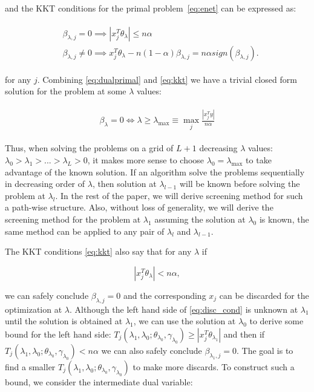 and the KKT conditions for the primal problem~\eqref{eq:enet} can be expressed as:

\begin{gather}
    \label{eq:kkt}
    \begin{aligned}&\beta_{\lambda,j}=0\implies|x_j^T\theta_\lambda|\leq n\alpha\\
    & \beta_{\lambda,j}\neq0\implies  x_j^T\theta_\lambda-n(1-\alpha)\beta_{\lambda,j}=n\alpha\textit{sign}(\beta_{\lambda,j}).
    \end{aligned}
\end{gather}

for any $j$. Combining \eqref{eq:dualprimal} and \eqref{eq:kkt} we have a trivial closed form solution for the problem at some $\lambda$ values:

\begin{gather}
    \label{eq:lammax}
    \begin{aligned}
        \beta_\lambda=0\iff \lambda \geq \lambda_{\max}\equiv \max_j \frac{|x_j^Ty|}{n\alpha}
    \end{aligned}
\end{gather}

Thus, when solving the problems on a grid of $L+1$ decreasing $\lambda$ values: $\lambda_0>\lambda_1>...>\lambda_L>0$, it makes more sense to choose $\lambda_0= \lambda_{\max}$ to take advantage of the known solution. If an algorithm solve the problems sequentially in decreasing order of $\lambda$, then solution at $\lambda_{l-1}$ will be known before solving the problem at $\lambda_l$. In the rest of the paper, we will derive screening method for such a path-wise structure. Also, without loss of generality, we will derive the screening method for the problem at $\lambda_1$ assuming the solution at $\lambda_0$ is known, the same method can be applied to any pair of $\lambda_{l}$ and $\lambda_{l-1}$.

The KKT conditions \eqref{eq:kkt} also say that for any $\lambda$ if 

\begin{equation}
    \label{eq:disc_cond}
    |x_j^T\theta_{\lambda}|<n\alpha,
\end{equation}

we can safely conclude $\beta_{\lambda,j}=0$ and the corresponding $x_j$ can be discarded for the optimization at $\lambda$. Although the left hand side of \eqref{eq:disc_cond} is unknown at $\lambda_1$ until the solution is obtained at $\lambda_1$, we can use the solution at $\lambda_{0}$ to derive some bound for the left hand side: $T_j(\lambda_{1},\lambda_{0};\theta_{\lambda_0},\gamma_{\lambda_0})\geq |x_j^T\theta_{\lambda_1}|$ and then if $T_j(\lambda_{1},\lambda_{0};\theta_{\lambda_0},\gamma_{\lambda_0})<n\alpha$ we can also safely conclude $\beta_{\lambda_1,j}=0$. The goal is to find a smaller $T_j(\lambda_{1},\lambda_{0};\theta_{\lambda_0},\gamma_{\lambda_0})$ to make more discards. To construct such a bound, we consider the intermediate dual variable:

